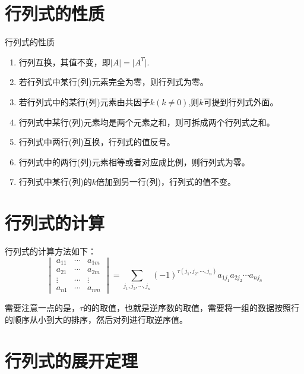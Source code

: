 \documentclass[lang=cn,10pt]{elegantbook}
\begin{document}
\section{行列式的性质}
\begin{property}\label{property:hls}
行列式的性质
\begin{enumerate}
\item 行列互换，其值不变，即$\vert A \vert=\vert A^{T} \vert$.
\item 若行列式中某行(列)元素完全为零，则行列式为零。
\item 若行列式中的某行(列)元素由共因子$k(k\ne 0)$,则$k$可提到行列式外面。
\item 行列式中某行(列)元素均是两个元素之和，则可拆成两个行列式之和。
\item 行列式中两行(列)互换，行列式的值反号。
\item 行列式中的两行(列)元素相等或者对应成比例，则行列式为零。
\item 行列式中某行(列)的$k$倍加到另一行(列)，行列式的值不变。
\end{enumerate}
\end{property}

\section{行列式的计算}
行列式的计算方法如下：
\begin{equation}
    \begin{vmatrix}
        a_{11}&\cdots&a_{1m}\\
        a_{21}&\cdots&a_{2m}\\
        \vdots&\cdots&\vdots\\
        a_{n1}&\cdots&a_{nm}
    \end{vmatrix}=\sum\limits_{j_1,j_2,\cdots,j_n}(-1)^{\tau(j_1,j_2,\cdots,j_n)}a_{1j_1}a_{2j_2} \cdots a_{nj_n}
\end{equation}

需要注意一点的是，$\tau$的的取值，也就是逆序数的取值，需要将一组的数据按照行的顺序从小到大的排序，然后对列进行取逆序值。

\section{行列式的展开定理}
\end{document}
